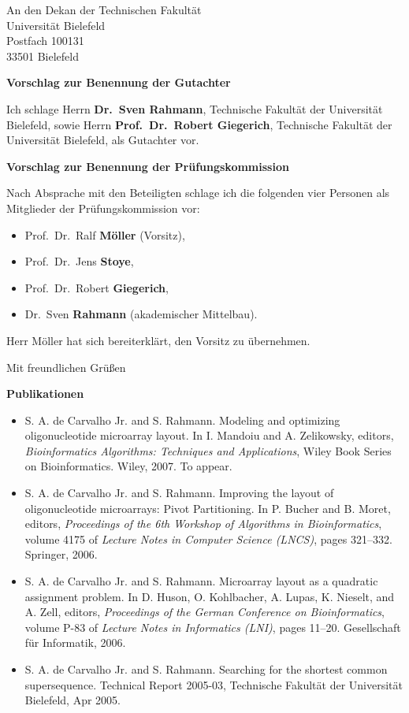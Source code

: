 \documentclass[11pt,a4paper]{letter}
\date{27. Februar 2007}
\begin{document}
\begin{letter}{
  An den Dekan der Technischen Fakult\"at\\
  Universit\"at Bielefeld\\
  Postfach 100131\\
  33501 Bielefeld
}

\opening{ {\bf Vorschlag zur Benennung der Gutachter}}

Ich schlage Herrn \textbf{Dr.\ Sven Rahmann}, Technische Fakult\"at der
Universit\"at Bielefeld, sowie Herrn \textbf{Prof.\ Dr.\ Robert Giegerich},
Technische Fakult\"at der  Universit\"at Bielefeld, als Gutachter vor.

{\bf Vorschlag zur Benennung der Pr\"ufungskommission}

Nach Absprache mit den Beteiligten schlage ich die folgenden vier Personen als
Mitglieder der Pr\"ufungskommission vor:
\begin{itemize}
  \item Prof.\ Dr.\ Ralf \textbf{M\"oller} (Vorsitz),
  \item Prof.\ Dr.\ Jens \textbf{Stoye},
  \item Prof.\ Dr.\ Robert \textbf{Giegerich},
  \item Dr.\ Sven \textbf{Rahmann} (akademischer Mittelbau).
\end{itemize}

Herr M\"oller hat sich bereiterkl\"art, den Vorsitz zu \"ubernehmen.

\closing{Mit freundlichen Gr\"u{\ss}en}


\newpage
{\bf\large Publikationen}

\begin{itemize}
\item S. A. de Carvalho Jr. and S. Rahmann. Modeling and optimizing
oligonucleotide microarray layout. In I. Mandoiu and A. Zelikowsky, editors,
\emph{Bioinformatics Algorithms: Techniques and Applications}, Wiley Book Series
on Bioinformatics. Wiley, 2007. To appear.

\item S. A. de Carvalho Jr. and S. Rahmann. Improving the layout of
oligonucleotide microarrays: Pivot Partitioning. In P. Bucher and B. Moret,
editors, \emph{Proceedings of the 6th Workshop of Algorithms in Bioinformatics},
volume 4175 of \emph{Lecture Notes in Computer Science (LNCS)}, pages 321--332.
Springer, 2006.

\item S. A. de Carvalho Jr. and S. Rahmann. Microarray layout as a quadratic
assignment problem. In D. Huson, O. Kohlbacher, A. Lupas, K. Nieselt, and A.
Zell, editors, \emph{Proceedings of the German Conference on Bioinformatics},
volume P-83 of \emph{Lecture Notes in Informatics (LNI)}, pages 11--20.
Gesellschaft f\"ur Informatik, 2006.

\item S. A. de Carvalho Jr. and S. Rahmann. Searching for the shortest common
supersequence. Technical Report 2005-03, Technische Fakult\"at der Universit\"at
Bielefeld, Apr 2005.
\end{itemize}

\end{letter}
\end{document}
